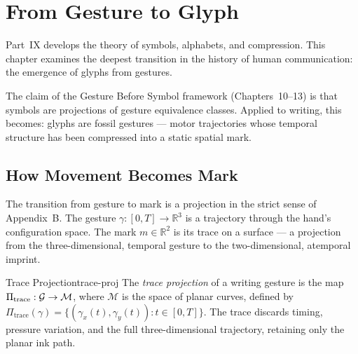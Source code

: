 \chapter{From Gesture to Glyph}



Part~IX develops the theory of symbols, alphabets, and compression.
This chapter examines the deepest transition in the history of human
communication: the emergence of glyphs from gestures.

The claim of the Gesture Before Symbol framework (Chapters~10--13) is
that symbols are projections of gesture equivalence classes. Applied to
writing, this becomes: glyphs are fossil gestures — motor trajectories
whose temporal structure has been compressed into a static spatial mark.

\section{How Movement Becomes Mark}

The transition from gesture to mark is a projection in the strict
sense of Appendix~B. The gesture $\gamma : [0,T] \to \mathbb{R}^3$
is a trajectory through the hand's configuration space. The mark
$m \in \mathbb{R}^2$ is its trace on a surface — a projection from
the three-dimensional, temporal gesture to the two-dimensional, atemporal
imprint.

\begin{definition}{Trace Projection}{trace-proj}
  The \emph{trace projection} of a writing gesture is the map
  $\Pi_\text{trace} : \mathcal{G} \to \mathcal{M}$, where
  $\mathcal{M}$ is the space of planar curves, defined by
  $\Pi_\text{trace}(\gamma) = \{(\gamma_x(t), \gamma_y(t)) : t \in [0,T]\}$.
  The trace discards timing, pressure variation, and the full
  three-dimensional trajectory, retaining only the planar ink path.
\end{definition}

